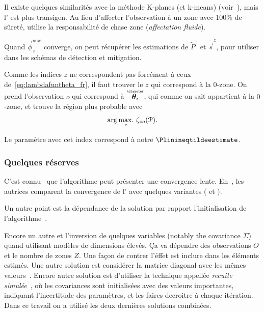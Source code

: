 \documentclass[../main.tex]{subfiles}
\begin{document}
Il existe quelques similarités avec la méthode K-planes (et k-means) (voir~\cite{BradleyMangasarian2000}), mais l'\EM{} est plus transigen.
Au lieu d'affecter l'observation à un zone avec 100\% de sûreté, \EM{} utilise la responsabilité de chase zone (\emph{affectation fluide}).

Quand $\vec{\phi}_{z}^{\mathrm{new}}$ converge, on peut récupérer les estimations de $\tilde{P}^{z}$ et $\tilde{\vec{s}}^{z}$, pour utiliser dans les schémas de détection et mitigation.

Comme les indices $z$ ne correspondent pas forcément à ceux de~\eqref{eq:lambdafuntheta_fr}, il faut trouver le $z$ qui correspond à la $0$-zone.
On prend l'observation $o$ qui correspond à $\thetairestricted$, qui comme on sait appartient à la $0$-zone, et trouve la région plus probable avec
\begin{equation*}\label{eq:argmaxz_fr}
  \arg\underset{z}{\max\!.}\ {\zeta_{zo}(\mathcal{P})}.
\end{equation*}

Le paramètre avec cet index correspond à notre $\Plinineqtildeestimate$.

\subsubsection{Quelques réserves}

C'est connu~\cite{CeleuxGovaert1992,Bishop2006,BaudryCeleux2015} que l'algorithme peut présenter une convergence lente.
En~\cite{FariaSoromenho2010}, les autrices comparent la convergence de l'\EM{} avec quelques variantes (\sEM{} et \CEM{}).

Un autre point est la dépendance de la solution par rapport l'initialisation de l'algorithme~\cite{KarlisXekalaki2003,BaudryCeleux2015}.

Encore un autre et l'inversion de quelques variables (notably the covariance $\Sigma$) quand utilisant modèles de dimensions élevés.
Ça va dépendre des observations $O$ et le nombre de zones $Z$.
Une façon de contrer l'éffet est inclure dans les éléments estimés.
Une autre solution est considérer la matrice diagonal avec les mêmes valeurs~\cite{KarlisXekalaki2003}.
Encore autre solution est d'utiliser la technique appellée \emph{recuite simulée}~\cite{CeleuxGovaert1992,OzerovFevotte2010}, où les covariances sont initialisées avec des valeurs importantes, indiquant l'incertitude des paramètres, et les faires decroitre à chaque itération.
Dans ce travail on a utilisé les deux dernières solutions combinées.
\end{document}
